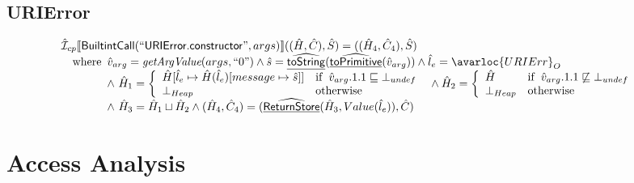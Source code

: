 \subsection{URIError}
\[
\begin{array}{l}
\aI _{cp}\lbr \SF{BuiltintCall}(``\SF{URIError.constructor}",args)\rbr((\hat{H},\hat{C}), \hat{S})
  = ((\hat{H}_4, \hat{C}_4), \hat{S})\\
\quad\wherec{
  \hat{v}_{arg} = \hf{getArgValue}(args, ``0")
  \land \hat{s}= \ahf{toString}(\ahf{toPrimitive}(\hat{v}_{arg}))
  \land \hat{l}_e = \avarloc{URIErr}_O\\
  \land\ \hat{H}_1 = \left\{\begin{array}{ll}
      \hat{H}[\hat{l}_e \mapsto \hat{H}(\hat{l}_e)[message \mapsto \hat{s}]]
      & \ifc{\hat{v}_{arg}.1.1 \sqsubseteq \bot_{undef}}\\
      \bot_{Heap} & \owc
    \end{array}\right.
  \land \hat{H}_2 = \left\{\begin{array}{ll}
      \hat{H}
      & \ifc{\hat{v}_{arg}.1.1 \not\sqsubseteq \bot_{undef}}\\
      \bot_{Heap} & \owc
    \end{array}\right.\\
  \land\ \hat{H}_3 = \hat{H}_1 \sqcup \hat{H}_2
  \land (\hat{H}_4, \hat{C}_4) = (\ahf{ReturnStore}(\hat{H}_3, Value(\hat{l}_e)), \hat{C})\\
  }\\

\end{array}
\]

\section{Access Analysis}

